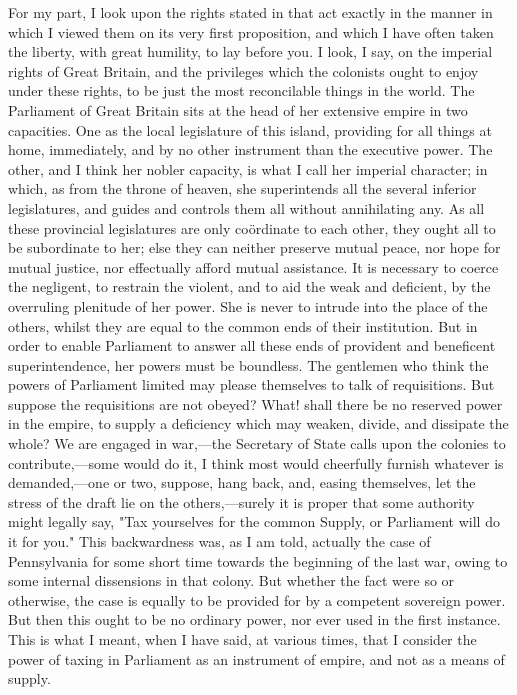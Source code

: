 For my part, I look upon the rights stated in that act exactly in the manner in which I viewed them on its very first proposition, and which I have often taken the liberty, with great humility, to lay before you. I look, I say, on the imperial rights of Great Britain, and the privileges which the colonists ought to enjoy under these rights, to be just the most reconcilable things in the world. The Parliament of Great Britain sits at the head of her extensive empire in two capacities. One as the local legislature of this island, providing for all things at home, immediately, and by no other instrument than the executive power. The other, and I think her nobler capacity, is what I call her imperial character; in which, as from the throne of heaven, she superintends all the several inferior legislatures, and guides and controls them all without annihilating any. As all these provincial legislatures are only coördinate to each other, they ought all to be subordinate to her; else they can neither preserve mutual peace, nor hope for mutual justice, nor effectually afford mutual assistance. It is necessary to coerce the negligent, to restrain the violent, and to aid the weak and deficient, by the overruling plenitude of her power. She is never to intrude into the place of the others, whilst they are equal to the common ends of their institution. But in order to enable Parliament to answer all these ends of provident and beneficent superintendence, her powers must be boundless. The gentlemen who think the powers of Parliament limited may please themselves to talk of requisitions. But suppose the requisitions are not obeyed? What! shall there be no reserved power in the empire, to supply a deficiency which may weaken, divide, and dissipate the whole? We are engaged in war,—the Secretary of State calls upon the colonies to contribute,—some would do it, I think most would cheerfully furnish whatever is demanded,—one or two, suppose, hang back, and, easing themselves, let the stress of the draft lie on the others,—surely it is proper that some authority might legally say, "Tax yourselves for the common Supply, or Parliament will do it for you." This backwardness was, as I am told, actually the case of Pennsylvania for some short time towards the beginning of the last war, owing to some internal dissensions in that colony. But whether the fact were so or otherwise, the case is equally to be provided for by a competent sovereign power. But then this ought to be no ordinary power, nor ever used in the first instance. This is what I meant, when I have said, at various times, that I consider the power of taxing in Parliament as an instrument of empire, and not as a means of supply.

